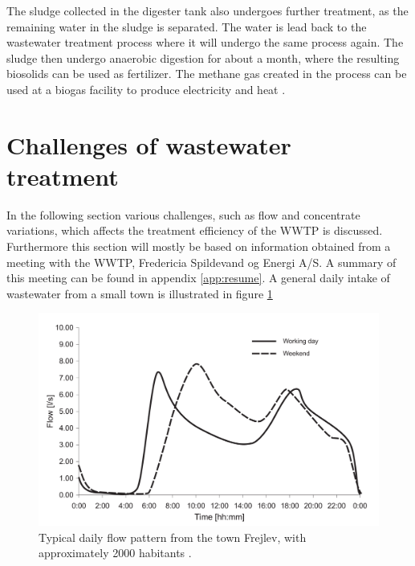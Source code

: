 The sludge collected in the digester tank also undergoes further treatment, as the remaining water in the sludge is separated. The water is lead back to the wastewater treatment process where it will undergo the same process again. The sludge then undergo anaerobic digestion for about a month, where the resulting biosolids can be used as fertilizer. The methane gas created in the process can be used at a biogas facility to produce electricity and heat \cite{wwtp_ekstra}.


\section{Challenges of wastewater treatment}\label{sec:WWTP_challenges}
In the following section various challenges, such as flow and concentrate variations, which affects the treatment efficiency of the WWTP is discussed. 
Furthermore this section will mostly be based on information obtained from a meeting with the WWTP, Fredericia Spildevand og Energi A/S. A summary of this meeting can be found in appendix \ref{app:resume}.
A general daily intake of wastewater from a small town is illustrated in figure \ref{fig:input_to_wwtp}  

\begin{figure}[H]
\centering
\includegraphics[width=.6\textwidth]{report/introduction/pictures/poopflow.png}
\caption{Typical daily flow pattern from the town Frejlev, with approximately 2000 habitants \cite{schlutter1999numerical}.}
\label{fig:input_to_wwtp}%
\end{figure} 

